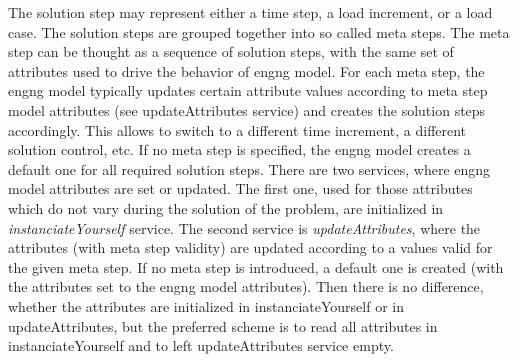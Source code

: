 \documentclass[a4paper]{article}
\newcommand{\service}[1]{{\em #1}}
\begin{document}
The solution step may represent either a time step, a load increment, or a load
case. The solution steps are grouped together into so called meta steps. 
The meta step can be thought as a sequence of
solution steps, with the same set of attributes used to drive the behavior of
engng model.
For each meta step, the engng model typically updates  
certain attribute values  according to meta step model  attributes (see
updateAttributes service) and creates the solution steps
accordingly. This allows to switch to a different time increment, 
a different solution control, etc. If no meta step is specified, the engng model
creates a default one for all required solution steps. There are two
services, where engng model attributes are set or updated. The first one,
used for those attributes which do not vary during the solution 
of the problem, are initialized  in \service{instanciateYourself} service.
The second service is \service{updateAttributes}, where the attributes 
(with meta step validity) are updated according to a values valid for the
given meta step.
If no meta step is introduced, a default one is created 
(with the attributes set to the engng model attributes). 
Then there is no difference, whether the attributes are initialized 
in instanciateYourself or in updateAttributes, but
the preferred scheme is to read all attributes in instanciateYourself 
and to left updateAttributes service empty.
\end{document}
